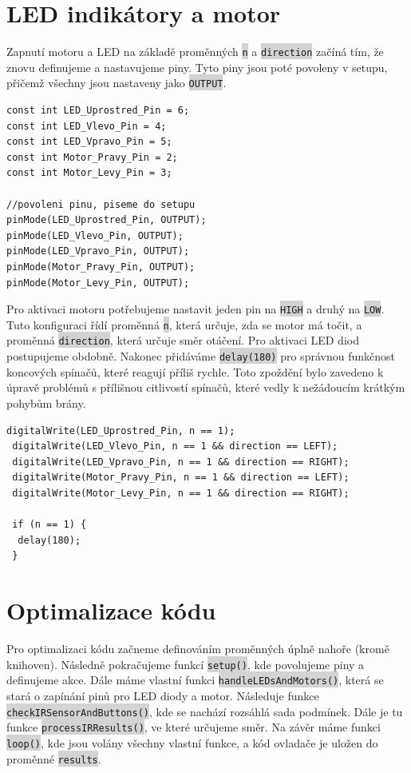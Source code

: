 \documentclass[12pt, a4paper, twoside]{report}
\newcommand{\code}[1]{\colorbox{lightgray}{\texttt{#1}}}
\begin{document}
	\newpage
	
	\section{LED indikátory a motor}
		
	\noindent Zapnutí motoru a LED na základě proměnných \code{n} a \code{direction} začíná tím, že znovu definujeme a nastavujeme piny. Tyto piny jsou poté povoleny v setupu, přičemž všechny jsou nastaveny jako \code{OUTPUT}. \\
	
\begin{lstlisting}[style=c++]
const int LED_Uprostred_Pin = 6;
const int LED_Vlevo_Pin = 4;
const int LED_Vpravo_Pin = 5;
const int Motor_Pravy_Pin = 2;
const int Motor_Levy_Pin = 3;

//povoleni pinu, piseme do setupu
pinMode(LED_Uprostred_Pin, OUTPUT);
pinMode(LED_Vlevo_Pin, OUTPUT);
pinMode(LED_Vpravo_Pin, OUTPUT);
pinMode(Motor_Pravy_Pin, OUTPUT);
pinMode(Motor_Levy_Pin, OUTPUT);
\end{lstlisting}
	
	 \noindent  Pro aktivaci motoru potřebujeme nastavit jeden pin na \code{HIGH} a druhý na \code{LOW}. Tuto konfiguraci řídí proměnná \code{n}, která určuje, zda se motor má točit, a proměnná \code{direction}, která určuje směr otáčení. Pro aktivaci LED diod postupujeme obdobně. Nakonec přidáváme \code{delay(180)} pro správnou funkčnost koncových spínačů, které reagují příliš rychle. Toto zpoždění bylo zavedeno k úpravě problémů s přílišnou citlivostí spínačů, které vedly k nežádoucím krátkým pohybům brány. \\

	
\begin{lstlisting}[style=c++]
 digitalWrite(LED_Uprostred_Pin, n == 1);
 digitalWrite(LED_Vlevo_Pin, n == 1 && direction == LEFT);
 digitalWrite(LED_Vpravo_Pin, n == 1 && direction == RIGHT);
 digitalWrite(Motor_Pravy_Pin, n == 1 && direction == LEFT);
 digitalWrite(Motor_Levy_Pin, n == 1 && direction == RIGHT);
	
 if (n == 1) {
  delay(180);
 }
\end{lstlisting}

	\newpage

	\section{Optimalizace kódu}
	
	\noindent Pro optimalizaci kódu začneme definováním proměnných úplně nahoře (kromě knihoven). Následně pokračujeme funkcí \code{setup()}, kde povolujeme piny a definujeme akce. Dále máme vlastní funkci \code{handleLEDsAndMotors()}, která se stará o zapínání pinů pro LED diody a motor. Následuje funkce \code{checkIRSensorAndButtons()}, kde se nachází rozsáhlá sada podmínek. Dále je tu funkce \code{processIRResults()}, ve které určujeme směr. Na závěr máme funkci \code{loop()}, kde jsou volány všechny vlastní funkce, a kód ovladače je uložen do proměnné \code{results}. \\
	
\end{document}
